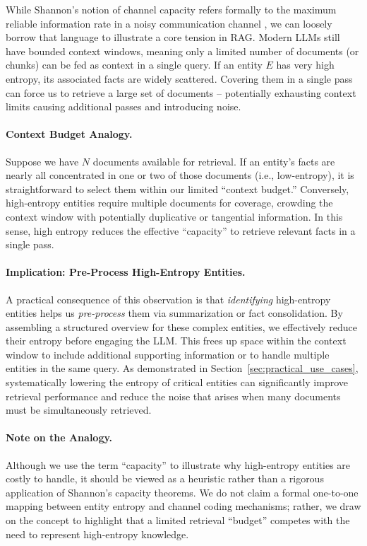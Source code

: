 \documentclass[11pt,a4paper]{article}
\begin{document}
While Shannon's notion of channel capacity refers formally to the maximum reliable information rate in a noisy communication channel \cite{shannon1948mathematical}, we can loosely borrow that language to illustrate a core tension in RAG. Modern LLMs still have bounded context windows, meaning only a limited number of documents (or chunks) can be fed as context in a single query. If an entity $E$ has very high entropy, its associated facts are widely scattered. Covering them in a single pass can force us to retrieve a large set of documents -- potentially exhausting context limits causing additional passes and introducing noise.

\paragraph{Context Budget Analogy.}
Suppose we have $N$ documents available for retrieval. If an entity’s facts are nearly all concentrated in one or two of those documents (i.e., low-entropy), it is straightforward to select them within our limited “context budget.” Conversely, high-entropy entities require multiple documents for coverage, crowding the context window with potentially duplicative or tangential information. In this sense, high entropy reduces the effective ``capacity'' to retrieve relevant facts in a single pass.

\paragraph{Implication: Pre-Process High-Entropy Entities.}
A practical consequence of this observation is that \emph{identifying} high-entropy entities helps us \emph{pre-process} them via summarization or fact consolidation. By assembling a structured overview for these complex entities, we effectively reduce their entropy before engaging the LLM. This frees up space within the context window to include additional supporting information or to handle multiple entities in the same query. As demonstrated in Section~\ref{sec:practical_use_cases}, systematically lowering the entropy of critical entities can significantly improve retrieval performance and reduce the noise that arises when many documents must be simultaneously retrieved.

\paragraph{Note on the Analogy.}
Although we use the term ``capacity'' to illustrate why high-entropy entities are costly to handle, it should be viewed as a heuristic rather than a rigorous application of Shannon’s capacity theorems. We do not claim a formal one-to-one mapping between entity entropy and channel coding mechanisms; rather, we draw on the concept to highlight that a limited retrieval “budget” competes with the need to represent high-entropy knowledge.
\end{document}
